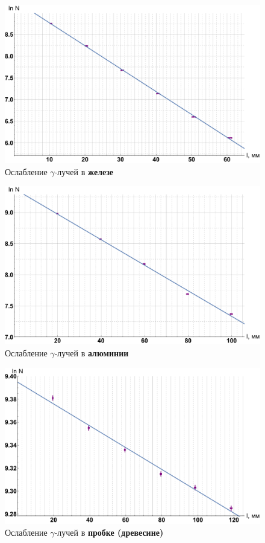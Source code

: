 \documentclass[12pt]{kiarticle} %
\newcommand{\ga}{\ensuremath{\gamma}}
\begin{document}
\begin{figure}[h!]
	\label{graf_fe}
	\includegraphics[scale=0.47]{fe.pdf}
	\caption{Ослабление \ga-лучей в \textbf{железе}}
\end{figure}

\begin{figure}[h!]
	\label{graf_al}
	\includegraphics[scale=0.47]{al.pdf}
	\caption{Ослабление \ga-лучей в \textbf{алюминии}}
\end{figure}

	\begin{figure}[h!]
	\label{graf_d}
	\includegraphics[scale=0.47]{d.pdf}
	\caption{Ослабление \ga-лучей в \textbf{пробке (древесине)}}
\end{figure}
\end{document}
